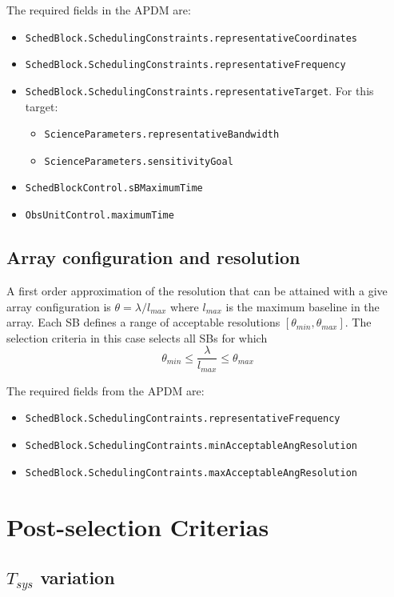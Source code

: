 \documentclass{article}
\begin{document}
%
%

The required fields in the APDM are:
\begin{itemize}
\item {\tt SchedBlock.SchedulingConstraints.representativeCoordinates}
\item {\tt SchedBlock.SchedulingConstraints.representativeFrequency}
\item {\tt SchedBlock.SchedulingConstraints.representativeTarget}. For this target:
\begin{itemize}
\item {\tt ScienceParameters.representativeBandwidth}
\item {\tt ScienceParameters.sensitivityGoal}
\end{itemize}
\item {\tt SchedBlockControl.sBMaximumTime}
\item {\tt ObsUnitControl.maximumTime}
\end{itemize}

\subsection{Array configuration and resolution}

A first order approximation of the resolution that can be attained with a give
array configuration is $\theta = \lambda / l_{max}$ where $l_{max}$ is the maximum
baseline in the array. Each SB defines a range of acceptable resolutions $[\theta_{min}, \theta_{max}]$.
The selection criteria in this case selects all SBs for which
$$
\theta_{min} \leq \frac{\lambda}{l_{max}} \leq \theta_{max}
$$

The required fields from the APDM are:
\begin{itemize}
\item {\tt SchedBlock.SchedulingContraints.representativeFrequency} 
\item {\tt SchedBlock.SchedulingContraints.minAcceptableAngResolution} 
\item {\tt SchedBlock.SchedulingContraints.maxAcceptableAngResolution} 
\end{itemize}

\section{Post-selection Criterias}

\subsection{$T_{sys}$ variation}
\end{document}
